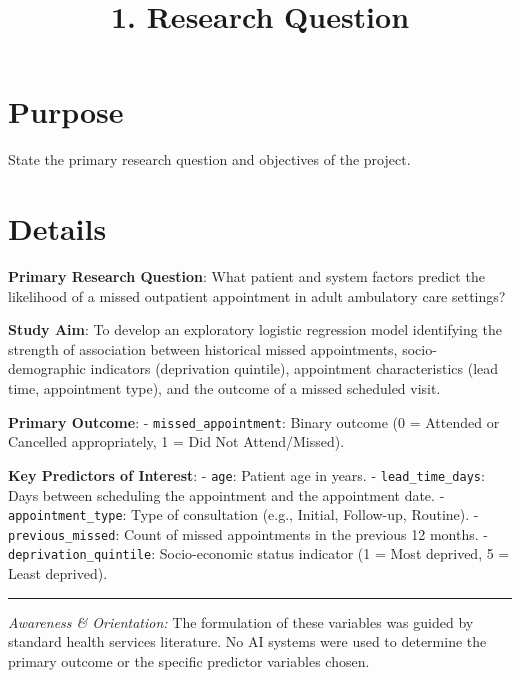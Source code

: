 \documentclass[
]{report}
\title{1. Research Question}
\author{}
\date{}
\renewcommand*\contentsname{Table of contents}
\newcommand\contentsname{Table of contents}
\begin{document}
\maketitle

\renewcommand*\contentsname{Table of contents}
{
\hypersetup{linkcolor=}
\setcounter{tocdepth}{2}
\tableofcontents
}

\chapter{Purpose}\label{purpose}

State the primary research question and objectives of the project.

\chapter{Details}\label{details}

\textbf{Primary Research Question}: What patient and system factors
predict the likelihood of a missed outpatient appointment in adult
ambulatory care settings?

\textbf{Study Aim}: To develop an exploratory logistic regression model
identifying the strength of association between historical missed
appointments, socio-demographic indicators (deprivation quintile),
appointment characteristics (lead time, appointment type), and the
outcome of a missed scheduled visit.

\textbf{Primary Outcome}: - \texttt{missed\_appointment}: Binary outcome
(0 = Attended or Cancelled appropriately, 1 = Did Not Attend/Missed).

\textbf{Key Predictors of Interest}: - \texttt{age}: Patient age in
years. - \texttt{lead\_time\_days}: Days between scheduling the
appointment and the appointment date. - \texttt{appointment\_type}: Type
of consultation (e.g., Initial, Follow-up, Routine). -
\texttt{previous\_missed}: Count of missed appointments in the previous
12 months. - \texttt{deprivation\_quintile}: Socio-economic status
indicator (1 = Most deprived, 5 = Least deprived).

\begin{center}\rule{0.5\linewidth}{0.5pt}\end{center}

\begin{tcolorbox}[enhanced jigsaw, toprule=.15mm, toptitle=1mm, titlerule=0mm, title=\textcolor{quarto-callout-note-color}{\faInfo}\hspace{0.5em}{AI Capability Checkpoint}, opacityback=0, arc=.35mm, leftrule=.75mm, left=2mm, opacitybacktitle=0.6, coltitle=black, bottomtitle=1mm, colbacktitle=quarto-callout-note-color!10!white, breakable, rightrule=.15mm, bottomrule=.15mm, colframe=quarto-callout-note-color-frame, colback=white]

\emph{Awareness \& Orientation:} The formulation of these variables was
guided by standard health services literature. No AI systems were used
to determine the primary outcome or the specific predictor variables
chosen.

\end{tcolorbox}
\end{document}
